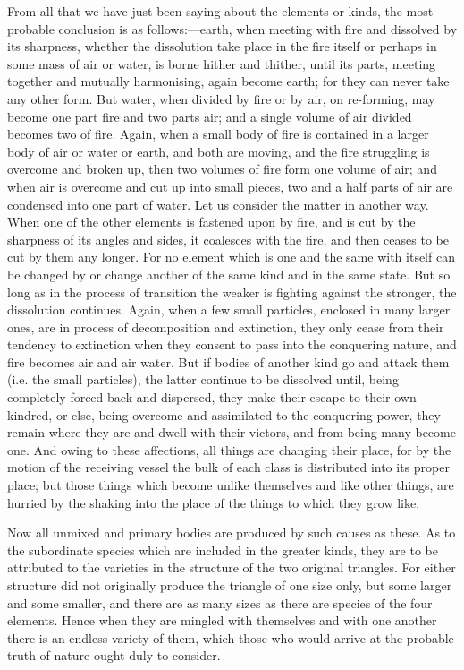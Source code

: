 \documentclass[11pt,letter]{article}
\begin{document}
\par  From all that we have just been saying about the elements or kinds, the most probable conclusion is as follows:—earth, when meeting with fire and dissolved by its sharpness, whether the dissolution take place in the fire itself or perhaps in some mass of air or water, is borne hither and thither, until its parts, meeting together and mutually harmonising, again become earth; for they can never take any other form. But water, when divided by fire or by air, on re-forming, may become one part fire and two parts air; and a single volume of air divided becomes two of fire. Again, when a small body of fire is contained in a larger body of air or water or earth, and both are moving, and the fire struggling is overcome and broken up, then two volumes of fire form one volume of air; and when air is overcome and cut up into small pieces, two and a half parts of air are condensed into one part of water. Let us consider the matter in another way. When one of the other elements is fastened upon by fire, and is cut by the sharpness of its angles and sides, it coalesces with the fire, and then ceases to be cut by them any longer. For no element which is one and the same with itself can be changed by or change another of the same kind and in the same state. But so long as in the process of transition the weaker is fighting against the stronger, the dissolution continues. Again, when a few small particles, enclosed in many larger ones, are in process of decomposition and extinction, they only cease from their tendency to extinction when they consent to pass into the conquering nature, and fire becomes air and air water. But if bodies of another kind go and attack them (i.e. the small particles), the latter continue to be dissolved until, being completely forced back and dispersed, they make their escape to their own kindred, or else, being overcome and assimilated to the conquering power, they remain where they are and dwell with their victors, and from being many become one. And owing to these affections, all things are changing their place, for by the motion of the receiving vessel the bulk of each class is distributed into its proper place; but those things which become unlike themselves and like other things, are hurried by the shaking into the place of the things to which they grow like.

\par  Now all unmixed and primary bodies are produced by such causes as these. As to the subordinate species which are included in the greater kinds, they are to be attributed to the varieties in the structure of the two original triangles. For either structure did not originally produce the triangle of one size only, but some larger and some smaller, and there are as many sizes as there are species of the four elements. Hence when they are mingled with themselves and with one another there is an endless variety of them, which those who would arrive at the probable truth of nature ought duly to consider.
\end{document}
